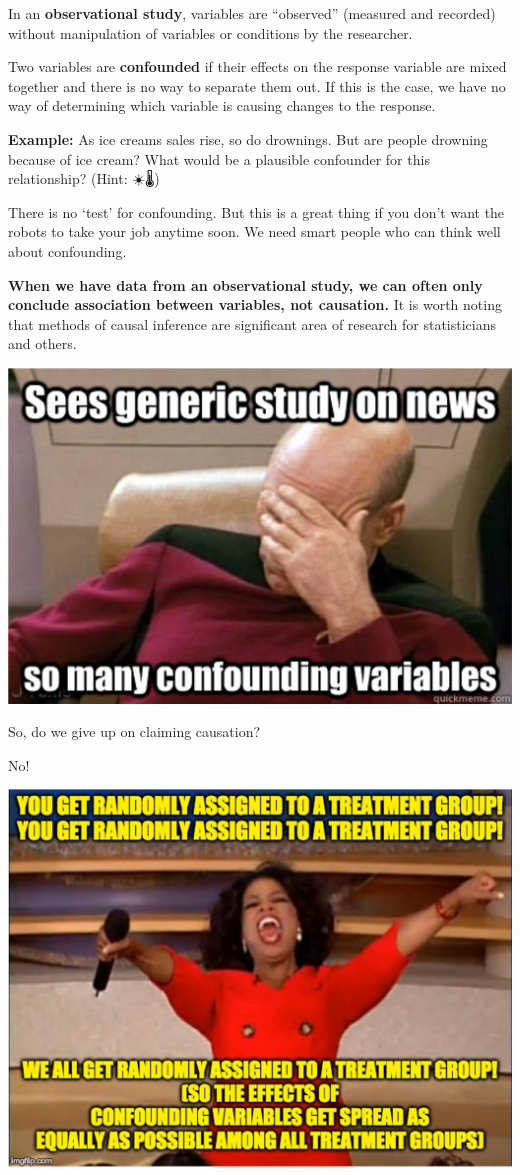 \documentclass[
  openany]{book}
\begin{document}
In an \textbf{observational study}, variables are ``observed'' (measured and recorded) without manipulation of variables or conditions by the researcher.

Two variables are \textbf{confounded} if their effects on the response variable are mixed together and there is no way to separate them out. If this is the case, we have no way of determining which variable is causing changes to the response.

\textbf{Example:} As ice creams sales rise, so do drownings. But are people drowning because of ice cream? What would be a plausible confounder for this relationship? (Hint: ☀️🌡️️)

There is no `test' for confounding. But this is a great thing if you don't want the robots to take your job anytime soon. We need smart people who can think well about confounding.

\textbf{When we have data from an observational study, we can often only conclude association between variables, not causation.} It is worth noting that methods of causal inference are significant area of research for statisticians and others.

\begin{center}\includegraphics[width=0.7\linewidth]{images/m2/picard} \end{center}

So, do we give up on claiming causation?

No!

\begin{center}\includegraphics[width=0.65\linewidth]{images/m2/oprah} \end{center}
\end{document}
